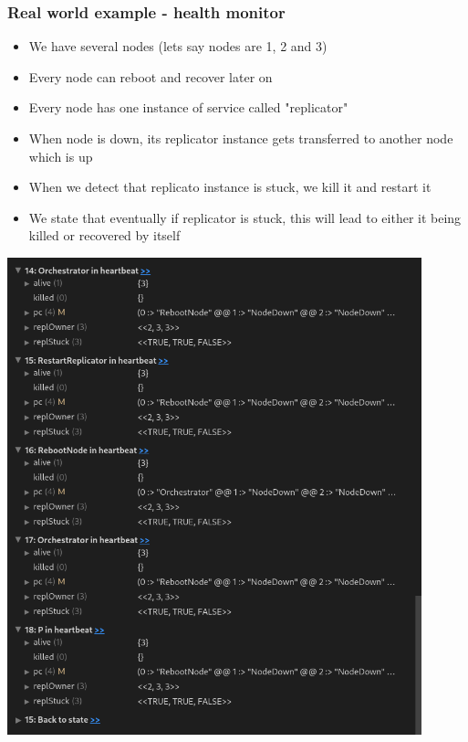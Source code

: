 \documentclass{beamer}
\begin{document}
\begin{frame}[fragile]
    \frametitle{Real world example - health monitor}
    \begin{itemize}
        \item We have several nodes (lets say nodes are 1, 2 and 3)
        \item Every node can reboot and recover later on 
        \item Every node has one instance of service called "replicator"
        \item When node is down, its replicator instance gets transferred to another node which is up 
        \item When we detect that replicato instance is stuck, we kill it and restart it 
        \item We state that eventually if replicator is stuck, this will lead to either it being killed or recovered by itself
    \end{itemize}
\end{frame}

\begin{frame}
    \includegraphics[width=0.9\textwidth, height=0.9\textheight]{examples/img1.png}
\end{frame}
\end{document}
